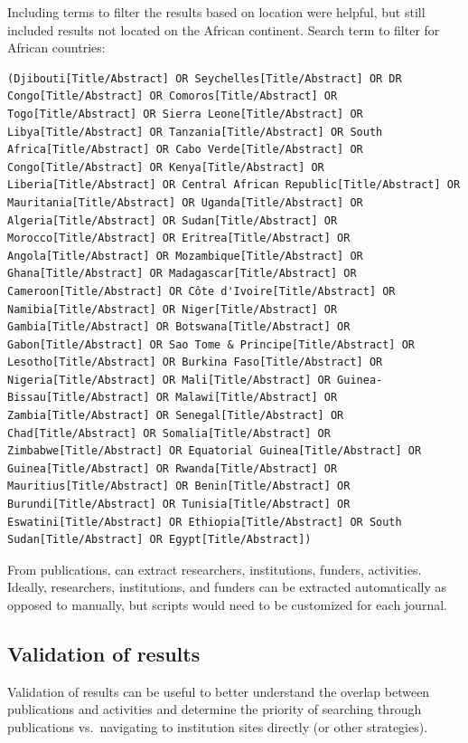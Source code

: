 \documentclass[
]{book}
\begin{document}
Including terms to filter the results based on location were helpful, but still included results not located on the African continent. Search term to filter for African countries:

\begin{verbatim}
(Djibouti[Title/Abstract] OR Seychelles[Title/Abstract] OR DR Congo[Title/Abstract] OR Comoros[Title/Abstract] OR Togo[Title/Abstract] OR Sierra Leone[Title/Abstract] OR Libya[Title/Abstract] OR Tanzania[Title/Abstract] OR South Africa[Title/Abstract] OR Cabo Verde[Title/Abstract] OR Congo[Title/Abstract] OR Kenya[Title/Abstract] OR Liberia[Title/Abstract] OR Central African Republic[Title/Abstract] OR Mauritania[Title/Abstract] OR Uganda[Title/Abstract] OR Algeria[Title/Abstract] OR Sudan[Title/Abstract] OR Morocco[Title/Abstract] OR Eritrea[Title/Abstract] OR Angola[Title/Abstract] OR Mozambique[Title/Abstract] OR Ghana[Title/Abstract] OR Madagascar[Title/Abstract] OR Cameroon[Title/Abstract] OR Côte d'Ivoire[Title/Abstract] OR Namibia[Title/Abstract] OR Niger[Title/Abstract] OR Gambia[Title/Abstract] OR Botswana[Title/Abstract] OR Gabon[Title/Abstract] OR Sao Tome & Principe[Title/Abstract] OR Lesotho[Title/Abstract] OR Burkina Faso[Title/Abstract] OR Nigeria[Title/Abstract] OR Mali[Title/Abstract] OR Guinea-Bissau[Title/Abstract] OR Malawi[Title/Abstract] OR Zambia[Title/Abstract] OR Senegal[Title/Abstract] OR Chad[Title/Abstract] OR Somalia[Title/Abstract] OR Zimbabwe[Title/Abstract] OR Equatorial Guinea[Title/Abstract] OR Guinea[Title/Abstract] OR Rwanda[Title/Abstract] OR Mauritius[Title/Abstract] OR Benin[Title/Abstract] OR Burundi[Title/Abstract] OR Tunisia[Title/Abstract] OR Eswatini[Title/Abstract] OR Ethiopia[Title/Abstract] OR South Sudan[Title/Abstract] OR Egypt[Title/Abstract]) 
\end{verbatim}

From publications, can extract researchers, institutions, funders, activities. Ideally, researchers, institutions, and funders can be extracted automatically as opposed to manually, but scripts would need to be customized for each journal.

\hypertarget{validation-of-results}{%
\subsection{Validation of results}\label{validation-of-results}}

Validation of results can be useful to better understand the overlap between publications and activities and determine the priority of searching through publications vs.~navigating to institution sites directly (or other strategies).
\end{document}
